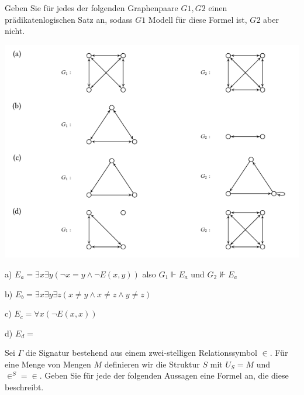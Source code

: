 \documentclass[10pt, a4paper]{exam}
\begin{document}
\begin{questions}
    \question Geben Sie für jedes der folgenden Graphenpaare $G1,G2$ einen prädikatenlogischen Satz an, sodass $G1$ Modell für diese Formel ist, $G2$ aber nicht.
    \begin{center}
        \includegraphics[width=.5\linewidth]{Assets/Logik-uebung6.png}
    \end{center}
    \begin{solution}

        a) $E_a=\exists x\exists y(\lnot x=y\wedge \lnot E(x,y))$ also $G_1\Vdash E_a$ und $G_2\not\Vdash E_a$

        b) $E_b=\exists x\exists y\exists z(x\not= y\wedge x\not= z \wedge y\not= z)$

        c) $E_c=\forall x(\lnot E(x,x))$

        d) $E_d=$
    \end{solution}

    \question Sei $\Gamma$ die Signatur bestehend aus einem zwei-stelligen Relationssymbol $\in$. Für eine Menge von Mengen $M$ definieren wir die Struktur $S$ mit $U_S=M$ und $\in^S=\in$. Geben Sie für jede der folgenden Aussagen eine Formel an, die diese beschreibt.
\end{questions}
\end{document}
